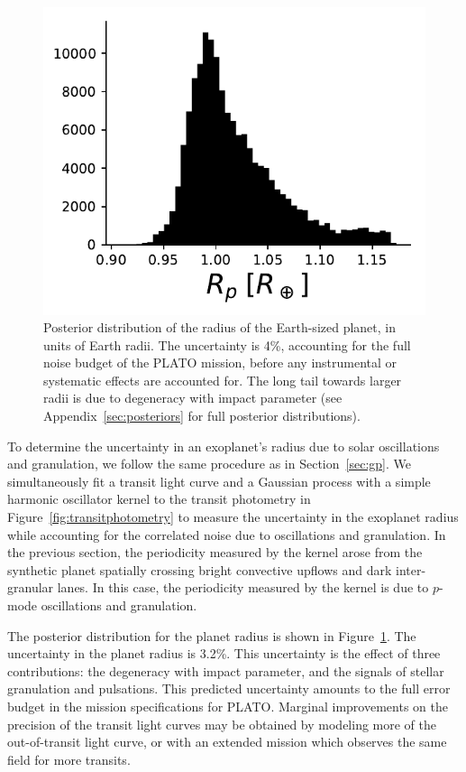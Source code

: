 \begin{figure}
    \centering
    \includegraphics[scale=0.8]{stash/radius_posterior.pdf}
    \caption{Posterior distribution of the radius of the Earth-sized planet, in units of Earth radii. The uncertainty is 4\%, accounting for the full noise budget of the PLATO mission, before any instrumental or systematic effects are accounted for. The long tail towards larger radii is due to degeneracy with impact parameter (see Appendix~\ref{sec:posteriors} for full posterior distributions).}
    \label{fig:radius_posterior}
\end{figure}

To determine the uncertainty in an exoplanet's radius due to solar oscillations and granulation, we follow the same procedure as in Section~\ref{sec:gp}. We simultaneously fit a \citet{Mandel2002} transit light curve and a Gaussian process with a simple harmonic oscillator kernel to the transit photometry in Figure~\ref{fig:transitphotometry} to measure the uncertainty in the exoplanet radius while accounting for the correlated noise due to oscillations and granulation. In the previous section, the periodicity measured by the kernel arose from the synthetic planet spatially crossing bright convective upflows and dark inter-granular lanes. In this case, the periodicity measured by the kernel is due to $p$-mode oscillations and granulation.

The posterior distribution for the planet radius is shown in Figure~\ref{fig:radius_posterior}. The uncertainty in the planet radius is 3.2\%. This uncertainty is the effect of three  contributions: the degeneracy with impact parameter, and the signals of stellar granulation and pulsations. This predicted uncertainty amounts to the full error budget in the mission specifications for PLATO. Marginal improvements on the precision of the transit light curves may be obtained by modeling more of the out-of-transit light curve, or with an extended mission which observes the same field for more transits. 

